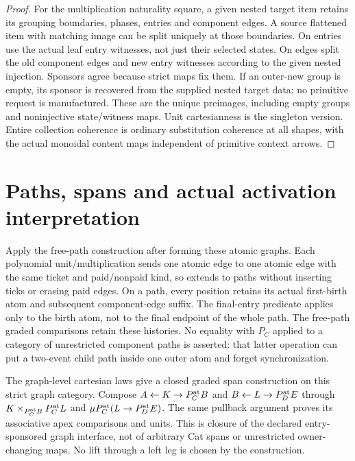 \documentclass[11pt]{article}
\begin{document}
\begin{proof}
For the multiplication naturality square, a given nested target item retains its grouping boundaries, phases, entries and component edges. A source flattened item with matching image can be split uniquely at those boundaries. On entries use the actual leaf entry witnesses, not just their selected states. On edges split the old component edges and new entry witnesses according to the given nested injection. Sponsors agree because strict maps fix them. If an outer-new group is empty, its sponsor is recovered from the supplied nested target data; no primitive request is manufactured. These are the unique preimages, including empty groups and noninjective state/witness maps. Unit cartesianness is the singleton version. Entire collection coherence is ordinary substitution coherence at all shapes, with the actual monoidal content maps independent of primitive context arrows.\end{proof}

\section{Paths, spans and actual activation interpretation}
Apply the free-path construction after forming these atomic graphs. Each polynomial unit/multiplication sends one atomic edge to one atomic edge with the same ticket and paid/nonpaid kind, so extends to paths without inserting ticks or erasing paid edges. On a path, every position retains its actual first-birth atom and subsequent component-edge suffix. The final-entry predicate applies only to the birth atom, not to the final endpoint of the whole path. The free-path graded comparisons retain these histories. No equality with $P_C$ applied to a category of unrestricted component paths is asserted: that latter operation can put a two-event child path inside one outer atom and forget synchronization.

The graph-level cartesian laws give a closed graded span construction on this strict graph category. Compose $A\leftarrow K\to P_C^{\rm at}B$ and $B\leftarrow L\to P_D^{\rm at}E$ through $K\times_{P_C^{\rm at}B}P_C^{\rm at}L$ and $\mu P_C^{\rm at}(L\to P_D^{\rm at}E)$. The same pullback argument proves its associative apex comparisons and units. This is closure of the declared entry-sponsored graph interface, not of arbitrary Cat spans or unrestricted owner-changing maps. No lift through a left leg is chosen by the construction.
\end{document}

